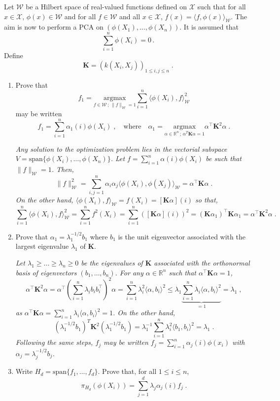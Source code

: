 \documentclass[a4paper,10pt,fleqn]{article}
\newcommand{\eqsp}{\,}
\newcommand{\rset}{\ensuremath{\mathbb{R}}}
\newcommand{\W}{\ensuremath{\mathcal{W}}}
\newcommand{\X}{\ensuremath{\mathcal{X}}}
\newcommand{\1}{\ensuremath{\mathbbm{1}}}
\newcommand{\bfK}{\mathbf{K}}
\begin{document}
Let $\W$ be a Hilbert space of real-valued functions defined on $\X$ such that for all $x\in\X$, $\phi(x)\in\W$ and for all $f\in \W$ and all $x\in\X$, $f(x) = \langle f,\phi(x) \rangle_{\W}$. The aim is now to perform a PCA on $(\phi(X_1),\ldots,\phi(X_n))$. It is assumed that
$$
\sum_{i=1}^n \phi(X_i) = 0\eqsp.
$$
Define
$$
\bfK = \left(k(X_i,X_j)\right)_{1\leqslant i,j \leqslant n}\;.
$$
\begin{enumerate}
\item Prove that
$$
f_1 =  \underset{f\in \W\,;\,\|f\|_\W=1}{\mathrm{argmax}} \sum_{i=1}^n\langle \phi(X_i),f\rangle_\W^2
$$
may be written
$$
f_1 = \sum_{i=1}^n \alpha_1(i) \phi(X_i)\;,\quad\mbox{where}\quad \alpha_1 =  \underset{\alpha\in \rset^n\,;\, \alpha^T \bfK\alpha=1}{\mathrm{argmax}}\alpha^\top\bfK^2\alpha\;.
$$

\vspace{.2cm}

{\em
Any solution to the optimization problem lies in the vectorial subspace $V = \mathrm{span}\{\phi(X_i), \ldots,\phi(X_n)\}$.
Let $f = \sum_{i=1}^n \alpha(i)\phi(X_i)$ be such that $\|f\|_{\W}=1$. Then,
$$
\|f\|_{\W}^2 = \sum_{i,j=1}^n \alpha_i\alpha_j \langle \phi(X_i),\phi(X_j)\rangle_\W = \alpha^\top \bfK \alpha\;.
$$
On the other hand, $\langle \phi(X_i),f\rangle_\W = f(X_i) = [\bfK\alpha](i)$ so that,
$$
\sum_{i=1}^n\langle \phi(X_i),f\rangle_\W^2 = \sum_{i=1}^nf^2(X_i) = \sum_{i=1}^n  \left([\bfK\alpha](i)\right)^2 = (\bfK\alpha_1)^\top\bfK\alpha_1 = \alpha^\top \bfK^2 \alpha\;.
$$
}
\item Prove that $\alpha_1 = \lambda_1^{-1/2}b_1$ where $b_1$ is the unit eigenvector associated with the largest eigenvalue $\lambda_1$ of $\bfK$.

\vspace{.2cm}

{\em
Let $\lambda_1\geqslant\ldots\geqslant \lambda_n\ge 0$ be the eigenvalues of $\bfK$ associated with the orthonormal basis of eigenvectors $(b_1,\ldots,b_n)$. For any $\alpha\in\rset^n$ such that $\alpha^\top \bfK\alpha=1$,
$$
\alpha^\top \bfK^2 \alpha = \alpha^\top\left(\sum_{i=1}^n\lambda_i b_ib^\top_i\right)^2 \alpha = \sum_{i=1}^n \lambda_i^2 \langle \alpha,b_i\rangle^2 \leqslant \lambda_1\underbrace{\sum_{i=1}^n \lambda_i\langle \alpha,b_i\rangle^2}_{=1}= \lambda_1\;,
$$
as $\alpha^\top \bfK\alpha = \sum_{i=1}^n \lambda_i\langle \alpha,b_i\rangle^2 = 1$. On the other hand,
$$
\left(\lambda_1^{-1/2}b_1\right)^T \bfK^2 \left(\lambda_1^{-1/2}b_1\right) = \lambda_1^{-1}\sum_{i=1}^n \lambda_i^2 \langle b_1,b_i\rangle^2 = \lambda_1\;.
$$
Following the same steps, $f_j$ may be written $f_j = \sum_{i=1}^n \alpha_j(i)\phi(x_i)$ with $\alpha_j = \lambda^{-1/2}_jb_j$.
}
\item Write $H_d = \mathrm{span}\{f_1,\ldots,f_d\}$. Prove that, for all $1\leqslant i\leqslant n$,
$$
\pi_{H_d}(\phi(X_i)) = \sum_{j=1}^d \lambda_{j}\alpha_j(i)f_j\;.
$$


\end{enumerate}
\end{document}
